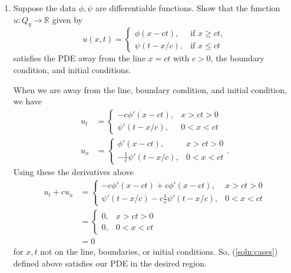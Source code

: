 \documentclass[a4paper,12pt]{article}
\newcommand{\reals}{\mathbb{R}}
\begin{document}
    \begin{enumerate}[label = \textbf{(\alph*)}]
        \item Suppose the data $ \phi, \psi $ are differentiable functions. Show that the function $ u : Q_{q} \to \reals $ given by 
        \begin{equation}
            u(x, t) = \begin{cases}
                \phi(x - ct), & \text{if } x \geq ct, \\
                \psi(t - x/c), & \text{if } x \leq ct
            \end{cases}
            \label{soln:cases}
        \end{equation}
        satisfies the PDE away from the line $ x = ct $ with $c > 0$, the boundary condition, and initial conditions. 
        
        When we are away from the line, boundary condition, and initial condition, we have
        \begin{align*}
            u_t &= \begin{cases}
                -c \phi'(x - ct), & x > ct > 0 \\
                \psi'(t - x/c), & 0 < x < ct
            \end{cases} \\
            u_x &= \begin{cases}
                \phi'(x - ct), & x > ct > 0 \\
                -\frac{1}{c} \psi'(t - x/c), & 0 < x < ct
            \end{cases}.
        \end{align*}
        Using these the derivatives above
        \begin{align*}
            u_t + c u_x &= \begin{cases}
                -c \phi'(x - ct) + c \phi'(x - ct), & x > ct > 0 \\
                \psi'(t - x/c) - c \frac{1}{c} \psi'(t - x/c), & 0 < x < ct
            \end{cases} \\
            &= \begin{cases}
                0, & x > ct > 0 \\
                0, & 0 < x < ct
            \end{cases} \\
            &= 0
        \end{align*}
        for $ x,t $ not on the line, boundaries, or initial conditions. So, (\ref{soln:cases})  defined above satisfies our PDE in the desired region.
        

\end{enumerate}
\end{document}
